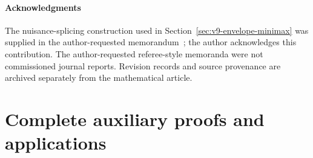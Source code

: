 \subsection*{Acknowledgments}
The nuisance-splicing construction used in
Section~\ref{sec:v9-envelope-minimax} was supplied in the
author-requested memorandum~\cite{A2ReviewV8}; the author acknowledges
this contribution.  The author-requested referee-style memoranda were
not commissioned journal reports.  Revision records and source
provenance are archived separately from the mathematical article.

\appendix
\renewcommand{\thesection}{A.\arabic{section}}
\renewcommand{\theHsection}{appendix.\arabic{section}}
\part{Complete auxiliary proofs and applications}



